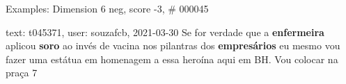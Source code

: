 \begin{frame}{Examples: Dimension 6 neg, score -3, \# 000045}
\footnotesize
\begin{alertblock}{text: t045371, user: souzafcb, 2021-03-30}
Se for verdade que a \textbf{enfermeira} aplicou \textbf{soro} ao invés de 
vacina nos pilantras dos \textbf{empresários} eu mesmo vou fazer uma estátua em 
homenagem a essa heroína aqui em BH. Vou colocar na praça 7 
\end{alertblock}
\end{frame}
